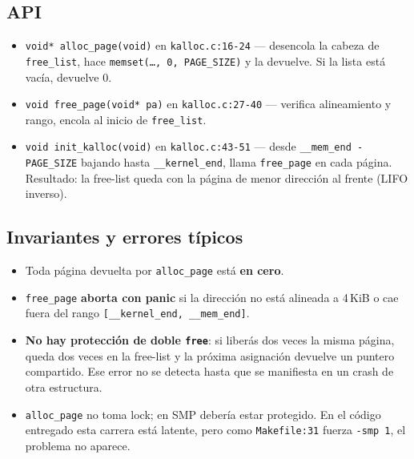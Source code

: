 \documentclass[11pt,a4paper]{article}
\begin{document}
\subsection*{API}

\begin{itemize}[leftmargin=*,nosep]
    \item \texttt{void* alloc\_page(void)} en \texttt{kalloc.c:16-24}
        — desencola la cabeza de \texttt{free\_list}, hace
        \texttt{memset(\dots, 0, PAGE\_SIZE)} y la devuelve. Si la
        lista está vacía, devuelve 0.
    \item \texttt{void free\_page(void* pa)} en \texttt{kalloc.c:27-40}
        — verifica alineamiento y rango, encola al inicio de
        \texttt{free\_list}.
    \item \texttt{void init\_kalloc(void)} en \texttt{kalloc.c:43-51}
        — desde \texttt{\_\_mem\_end - PAGE\_SIZE} bajando hasta
        \texttt{\_\_kernel\_end}, llama \texttt{free\_page} en
        cada página. Resultado: la free-list queda con la página
        de menor dirección al frente (LIFO inverso).
\end{itemize}

\subsection*{Invariantes y errores típicos}

\begin{itemize}[leftmargin=*,nosep]
    \item Toda página devuelta por \texttt{alloc\_page} está
        \textbf{en cero}.
    \item \texttt{free\_page} \textbf{aborta con panic} si la
        dirección no está alineada a 4\,KiB o cae fuera del rango
        \texttt{[\_\_kernel\_end, \_\_mem\_end]}.
    \item \textbf{No hay protección de doble \texttt{free}}: si
        liberás dos veces la misma página, queda dos veces en la
        free-list y la próxima asignación devuelve un puntero
        compartido. Ese error no se detecta hasta que se manifiesta
        en un crash de otra estructura.
    \item \texttt{alloc\_page} no toma lock; en SMP debería estar
        protegido. En el código entregado esta carrera está latente,
        pero como \texttt{Makefile:31} fuerza \texttt{-smp 1}, el
        problema no aparece.
\end{itemize}

\end{document}
